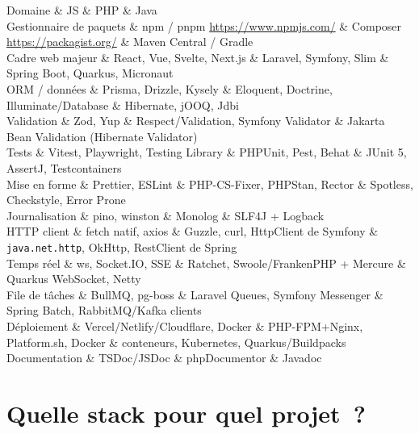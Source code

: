 \begin{tablez}
  \headrow Domaine \& JS \& PHP \& Java \\
  \midrule
  Gestionnaire de paquets \& npm / pnpm \url{https://www.npmjs.com/} \& Composer \url{https://packagist.org/} \& Maven Central / Gradle \\
  Cadre web majeur \& React, Vue, Svelte, Next.js \& Laravel, Symfony, Slim \& Spring Boot, Quarkus, Micronaut \\
  ORM / donn\'ees \& Prisma, Drizzle, Kysely \& Eloquent, Doctrine, Illuminate/Database \& Hibernate, jOOQ, Jdbi \\
  Validation \& Zod, Yup \& Respect/Validation, Symfony Validator \& Jakarta Bean Validation (Hibernate Validator) \\
  Tests \& Vitest, Playwright, Testing Library \& PHPUnit, Pest, Behat \& JUnit 5, AssertJ, Testcontainers \\
  Mise en forme \& Prettier, ESLint \& PHP-CS-Fixer, PHPStan, Rector \& Spotless, Checkstyle, Error Prone \\
  Journalisation \& pino, winston \& Monolog \& SLF4J + Logback \\
  HTTP client \& fetch natif, axios \& Guzzle, curl, HttpClient de Symfony \& \verb|java.net.http|, OkHttp, RestClient de Spring \\
  Temps r\'eel \& ws, Socket.IO, SSE \& Ratchet, Swoole/FrankenPHP + Mercure \& Quarkus WebSocket, Netty \\
  File de t\^aches \& BullMQ, pg-boss \& Laravel Queues, Symfony Messenger \& Spring Batch, RabbitMQ/Kafka clients \\
  D\'eploiement \& Vercel/Netlify/Cloudflare, Docker \& PHP-FPM+Nginx, Platform.sh, Docker \& conteneurs, Kubernetes, Quarkus/Buildpacks \\
  Documentation \& TSDoc/JSDoc \& phpDocumentor \& Javadoc \\
\end{tablez}

\section{Quelle stack pour quel projet~?}


